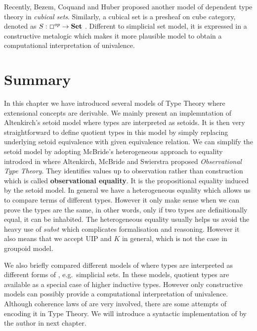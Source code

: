 Recently, Bezem, Coquand and Huber \cite{bezem2013model} proposed another model of dependent type theory 
in \emph{cubical sets}. Similarly, a cubical set is a presheaf on cube category, denoted as $S : \Box^{op} \rightarrow \operatorname{\mathbf{Set}}$ . Different to simplicial set model, it is expressed in a constructive metalogic which makes it more plausible model to obtain a computational interpretation of univalence.


\section{Summary}

In this chapter we have introduced several models of Type Theory where extensional concepts are derivable. We mainly present an implemntation of Altenkirch's setoid model where types are interpreted as setoids. It is then very straightforward to define quotient types in this model by simply replacing underlying setoid equivalence with given equivalence relation. 
We can simplify the setoid model by adopting McBride's heterogeneous
approach to equality introdced in \cite{alti:ott-conf} where Altenkirch, McBride and Swierstra
 proposed \emph{Observational Type Theory}. They identifies values up to observation rather than construction which is called \textbf{observational equality}. It is the propositional equality induced by the setoid model.  In general we have a heterogeneous equality which allows us to compare terms of different types. However it only make sense when we can prove the types are the same, in other words, only if two types are definitionally equal, it can be inhabited.
The heterogeneous equality usually helps us avoid the heavy use of $subst$ which complicates formalisation and reasoning. 
However it also means that we accept UIP and $K$ in general, which is not the case in groupoid model.



We also briefly compared different models of \hott where types are interpreted as different forms of \wog, e.g.\ simplicial sets. In these models, quotient types are available as a special case of higher inductive types. However only constructive models can possibly provide a computational interpretation of univalence.
Although coherence laws of \wog are very involved, there are some attempts of encoding it in Type Theory. We will introduce a syntactic implementation of \wog by the author in next chapter.














